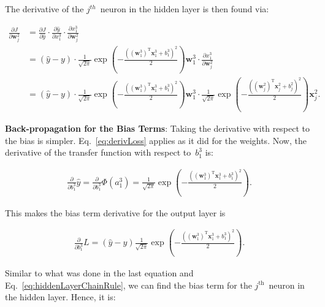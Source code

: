 \documentclass{report}
\newcommand{\w}{\mathbf{w}}
\newcommand{\xvec}{\mathbf{x}}
\newcommand{\yhat}{\hat{y}}
\newcommand{\T}{\text{T}}
\begin{document}
  The derivative of the $j^{th}$~neuron in the hidden layer is then found via:
  
  \begin{align}
    \frac{\partial J}{\partial \w_{j}^{2}} &= \frac{\partial J}{\partial \yhat} \cdot \frac{\partial \yhat}{\partial x_{1}^{3}} \cdot \frac{\partial x_{1}^{3}}{\partial \w_{j}^{2}}\label{eq:hiddenLayerChainRule}\\
      &=\left(\yhat - y\right) \cdot \frac{1}{\sqrt{2\pi}} \exp\left( -\frac{\left(\left(\w_{1}^{3}\right)^\T\xvec_{1}^{3}+b_{1}^{3}\right)^{2}}{2} \right)\w_{1}^{3} \cdot \frac{\partial x_{1}^{3}}{\partial \w_{j}^{2}}\\
      &=\boxed{\left(\yhat - y\right) \cdot \frac{1}{\sqrt{2\pi}} \exp\left( -\frac{\left(\left(\w_{1}^{3}\right)^\T\xvec_{1}^{3}+b_{1}^{3}\right)^{2}}{2} \right)\w_{1}^{3} \cdot \frac{1}{\sqrt{2\pi}} \exp\left( -\frac{\left(\left(\w_{j}^{2}\right)^\T\xvec_{j}^{2}+b_{j}^{2}\right)^{2}}{2} \right)\xvec_{j}^{2}}
      \textrm{.}
  \end{align}

  
  \textbf{Back-propagation for the Bias Terms}: Taking the derivative with respect to the bias is simpler.  Eq.~\ref{eq:derivLoss} applies as it did for the weights.  Now, the derivative of the transfer function with respect to~$b_{1}^{3}$ is:
  
  \begin{align}
    \frac{\partial}{\partial b_{1}^{3}} \yhat = \frac{\partial}{\partial b_{1}^{3}}\Phi(a_{1}^{3})=\frac{1}{\sqrt{2\pi}} \exp\left( -\frac{\left(\left(\w_{1}^{3}\right)^\T\xvec_{1}^{3}+b_{1}^{3}\right)^{2}}{2} \right)\textrm{.}
  \end{align}
    
  This makes the bias term derivative for the output layer is 
    
  \begin{align}
    \frac{\partial}{\partial b_{1}^{3}} L =\boxed{\left(\yhat - y\right)\frac{1}{\sqrt{2\pi}} \exp\left( -\frac{\left(\left(\w_{1}^{3}\right)^\T\xvec_{1}^{3}+b_{1}^{3}\right)^{2}}{2} \right)}\textrm{.}
  \end{align}
  
  Similar to what was done in the last equation and Eq.~\ref{eq:hiddenLayerChainRule}, we can find the bias term for the $j^{\text{th}}$~neuron in the hidden layer.  Hence, it is:
  
\end{document}

